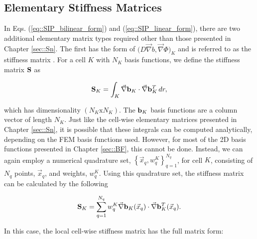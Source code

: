 \subsection{Elementary Stiffness Matrices}
\label{sec::DSA_SIP_Stiffness}

In Eqs. (\ref{eq::SIP_bilinear_form}) and (\ref{eq::SIP_linear_form}), there are two additional elementary matrix types required other than those presented in Chapter \ref{sec::Sn}. The first has the form of $\Big(  D \vec{\nabla}  b , \vec{\nabla} \Phi  \Big)_{K}$ and is referred to as the stiffness matrix \cite{akin1982application}. For a cell $K$ with $N_K$ basis functions, we define the stiffness matrix ${\bf S}$ as

\begin{equation}
\label{eq::DSA_stiffness_matrix_analytical}
{\bf S}_K =    \int_K \vec{\nabla} {\bf b}_K \cdot \vec{\nabla} {\bf b}_K^T \, d r ,
\end{equation}

\noindent which has dimensionality $(N_K \text{x} N_K)$. The ${\bf b}_K$ basis functions are a column vector of length $N_K$. Just like the cell-wise elementary matrices presented in Chapter \ref{sec::Sn}, it is possible that these integrals can be computed analytically, depending on the FEM basis functions used. However, for most of the 2D basis functions presented in Chapter \ref{sec::BF}, this cannot be done. Instead, we can again employ a numerical quadrature set, $\left\{  \vec{x}_q , w_q^{K}  \right\}_{q=1}^{N_q}$, for cell $K$, consisting of $N_q$ points, $\vec{x}_q$, and weights, $w_q^K$. Using this quadrature set, the stiffness matrix can be calculated by the following

\begin{equation}
\label{eq::DSA_stiffness_matrix_numerical}
{\bf S}_K = \sum_{q = 1}^{N_q} w_{q}^K \vec{\nabla} {\bf b}_K (\vec{x}_q) \cdot  \vec{\nabla}{\bf b}_K^T (\vec{x}_q)  .
\end{equation}

\noindent In this case, the local cell-wise stiffness matrix has the full matrix form:

